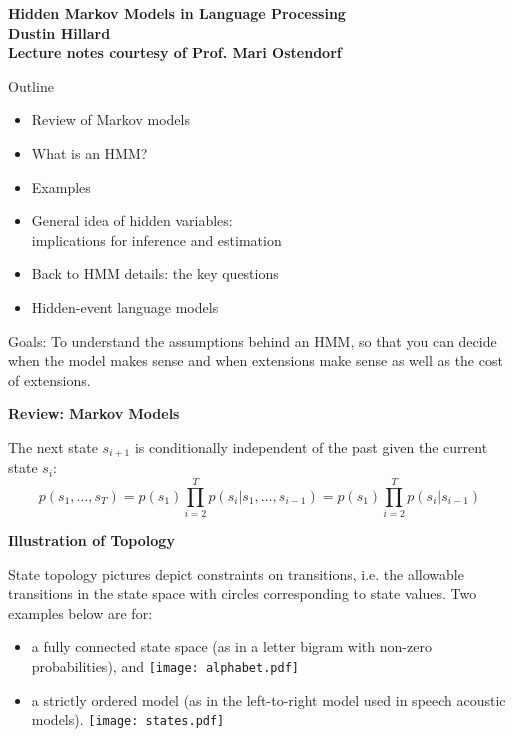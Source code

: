 \documentclass[11pt,titlepage]{article}
\begin{document}
\LARGE

\raggedright

\begin{center}
{\bf
{\huge \bf Hidden Markov Models in Language Processing}\\[0.1in]
Dustin Hillard\\[0.1in]
Lecture notes courtesy of Prof. Mari Ostendorf\\[0.1in]
}
\end{center}
\vskip 0.3in

Outline
\begin{itemize}
\item Review of Markov models
\item What is an HMM?
\item Examples
\item General idea of hidden variables:\\
	implications for inference and estimation
\item Back to HMM details: the key questions
\item Hidden-event language models
\end{itemize}

Goals: To understand the assumptions behind an HMM, so that you can
decide when the model makes sense and when extensions make sense as well
as the cost of extensions. 

\clearpage


\centerline{{\huge \bf Review: Markov Models}}
\vskip 0.3in

The next state $s_{i+1}$ is conditionally independent of the past
given the current state $s_i$:
$$p(s_1,\ldots , s_T) = p(s_1)\prod_{i=2}^T p(s_i|s_1,\ldots ,s_{i-1})
  = p(s_1)\prod_{i=2}^T p(s_i|s_{i-1}) $$

{\bf Illustration of Topology}

State topology pictures depict constraints on transitions, i.e. the
allowable transitions in the state space with circles corresponding to
state values.  Two examples below are for:
\begin{itemize} 
\item a fully connected state space (as in a letter bigram with non-zero
probabilities), and 
\texttt{[image: alphabet.pdf]}
\item a strictly ordered model (as in the left-to-right
model used in speech acoustic models).
\texttt{[image: states.pdf]}
\end{itemize}
\end{document}

